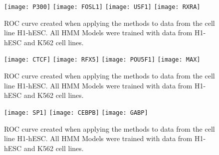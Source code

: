 \documentclass[11pt,a4]{article}
\begin{document}
\begin{figure}[h]
\centering
    \texttt{[image: P300]}
    \texttt{[image: FOSL1]}
    \texttt{[image: USF1]}
    \texttt{[image: RXRA]}
\caption{ROC curve created when applying the methods to data from the cell line H1-hESC. All HMM Models were trained with data from H1-hESC and K562 cell lines.}
\label{fig:roc.H1hesc.6}
\end{figure}

\begin{figure}[h]
\centering
    \texttt{[image: CTCF]}
    \texttt{[image: RFX5]}
    \texttt{[image: POU5F1]}
    \texttt{[image: MAX]}
\caption{ROC curve created when applying the methods to data from the cell line H1-hESC. All HMM Models were trained with data from H1-hESC and K562 cell lines.}
\label{fig:roc.H1hesc.7}
\end{figure}

\begin{figure}[h]
\centering
    \texttt{[image: SP1]}
    \texttt{[image: CEBPB]}
    \texttt{[image: GABP]}
\caption{ROC curve created when applying the methods to data from the cell line H1-hESC. All HMM Models were trained with data from H1-hESC and K562 cell lines.}
\label{fig:roc.H1hesc.8}
\end{figure}
\end{document}
